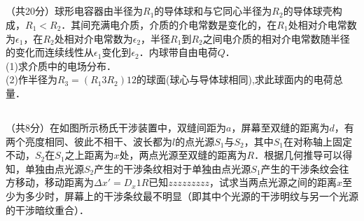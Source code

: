 \subsection{ }
（共20分）球形电容器由半径为$R_1$的导体球和与它同心半径为$R_2$的导体球壳构成，$R_1<R_2$．其间充满电介质，介质的介电常数是变化的，在$R_1$处相对介电常数为$\epsilon_1$，在$R_2$处相对介电常数为$\epsilon_2$，半径$R_1$到$R_2$之间电介质的相对介电常数随半径的变化而连续线性从$\epsilon_1$变化到$\epsilon_2$．内球带自由电荷$Q$．\\
(1)求介质中的电场分布．\\
(2)作半径为$R_{3}=(R_{1}3R_{2})12$的球面(球心与导体球相同),求此球面内的电荷总量．\\

\subsection{ }
（共8分）在如图所示杨氏干涉装置中，双缝间距为$a$，屏幕至双缝的距离为$d$，有两个亮度相同、彼此不相干、波长都为$l$的点光源$S_1$与$S_2$，其中$S_1$在对称轴上固定不动，$S_2$在$S_1$之上距离为$x$处，两点光源至双缝的距离为$R$．根据几何推导可以得知，单独由点光源$S_2$产生的干涉条纹相对于单独由点光源$S_1$产生的干涉条纹会往方移动，移动距离为$\Delta x'=D_{x}1R$已知$zzzzzzzzz$，试求当两点光源之间的距离$x$至少为多少时，屏幕上的干涉条纹最不明显（即其中个光源的干涉明纹与另一个光源的干涉暗纹重合）．